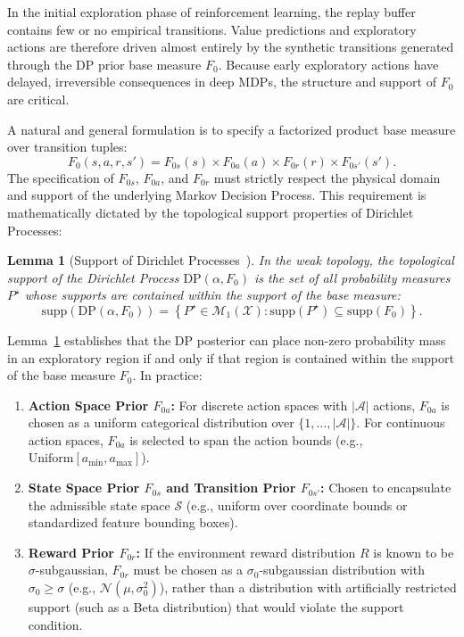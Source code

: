 \documentclass[10pt]{article}
\newtheorem{lem}{Lemma}
\begin{document}
In the initial exploration phase of reinforcement learning, the replay buffer contains few or no empirical transitions. Value predictions and exploratory actions are therefore driven almost entirely by the synthetic transitions generated through the DP prior base measure $F_0$. Because early exploratory actions have delayed, irreversible consequences in deep MDPs, the structure and support of $F_0$ are critical.

A natural and general formulation is to specify a factorized product base measure over transition tuples:
\begin{equation}
F_0(s, a, r, s') = F_{0s}(s) \times F_{0a}(a) \times F_{0r}(r) \times F_{0s'}(s').
\end{equation}
The specification of $F_{0s}$, $F_{0a}$, and $F_{0r}$ must strictly respect the physical domain and support of the underlying Markov Decision Process. This requirement is mathematically dictated by the topological support properties of Dirichlet Processes:

\begin{lem}[Support of Dirichlet Processes~\citep{ghosal2010dirichlet}] \label{thm:Support-of-DPs} 
In the weak topology, the topological support of the Dirichlet Process $\mathrm{DP}(\alpha, F_0)$ is the set of all probability measures $P^\star$ whose supports are contained within the support of the base measure:
\begin{equation}
\mathrm{supp}(\mathrm{DP}(\alpha, F_0)) = \left\{ P^\star \in \mathcal{M}_1(\mathcal{X}) : \mathrm{supp}(P^\star) \subseteq \mathrm{supp}(F_0) \right\}.
\end{equation}
\end{lem}

Lemma~\ref{thm:Support-of-DPs} establishes that the DP posterior can place non-zero probability mass in an exploratory region if and only if that region is contained within the support of the base measure $F_0$. In practice:
\begin{enumerate}[leftmargin=*,noitemsep]
\item \textbf{Action Space Prior $F_{0a}$:} For discrete action spaces with $|\mathcal{A}|$ actions, $F_{0a}$ is chosen as a uniform categorical distribution over $\{1, \dots, |\mathcal{A}|\}$. For continuous action spaces, $F_{0a}$ is selected to span the action bounds (e.g., $\text{Uniform}[a_{\min}, a_{\max}]$).
\item \textbf{State Space Prior $F_{0s}$ and Transition Prior $F_{0s'}$:} Chosen to encapsulate the admissible state space $\mathcal{S}$ (e.g., uniform over coordinate bounds or standardized feature bounding boxes).
\item \textbf{Reward Prior $F_{0r}$:} If the environment reward distribution $R$ is known to be $\sigma$-subgaussian, $F_{0r}$ must be chosen as a $\sigma_0$-subgaussian distribution with $\sigma_0 \ge \sigma$ (e.g., $\mathcal{N}(\mu, \sigma_0^2)$), rather than a distribution with artificially restricted support (such as a Beta distribution) that would violate the support condition.
\end{enumerate}
\end{document}
